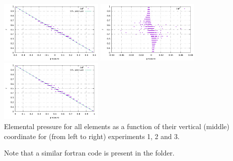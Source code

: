 \begin{center}
\includegraphics[width=5cm]{python_codes/fieldstone_10/results/model1/pressure.pdf}
\includegraphics[width=5cm]{python_codes/fieldstone_10/results/model2/pressure.pdf}
\includegraphics[width=5cm]{python_codes/fieldstone_10/results/model3/pressure.pdf}\\
{\captionfont Elemental pressure for all elements as a function of their vertical (middle) coordinate for
(from left to right) experiments 1, 2 and 3. }
\end{center}

Note that a similar fortran code is present in the folder. 
